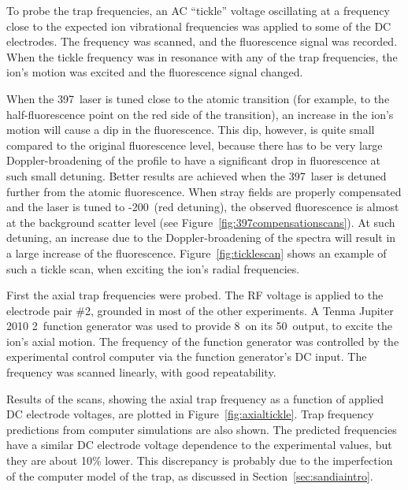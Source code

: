 To probe the trap frequencies, an AC ``tickle'' voltage oscillating at a frequency close to the expected ion vibrational frequencies was applied to some of the DC electrodes. The frequency was scanned, and the fluorescence signal was recorded. When the tickle frequency was in resonance with any of the trap frequencies, the ion's motion was excited and the fluorescence signal changed. 

When the 397\nm\, laser is tuned close to the atomic transition (for example, to the half-fluorescence point on the red side of the transition), an increase in the ion's motion will cause a dip in the fluorescence. This dip, however, is quite small compared to the original fluorescence level, because there has to be very large Doppler-broadening of the profile to have a significant drop in fluorescence at such small detuning. Better results are achieved when the 397\nm\, laser is detuned further from the atomic fluorescence. When stray fields are properly compensated and the laser is tuned to -200\MHz\, (red detuning), the observed fluorescence is almost at the background scatter level (see Figure~\ref{fig:397compensationscans}). At such detuning, an increase due to the Doppler-broadening of the spectra will result in a large increase of the fluorescence. Figure~\ref{fig:ticklescan} shows an example of such a tickle scan, when exciting the ion's radial frequencies.

First the axial trap frequencies were probed. The RF voltage is applied to the electrode pair \#2, grounded in most of the other experiments. A Tenma Jupiter 2010 2\MHz\, function generator was used to provide 8\Vpp\, on its 50\Ohm\, output, to excite the ion's axial motion. The frequency of the function generator was controlled by the experimental control computer via the function generator's DC input. The frequency was scanned linearly, with good repeatability.

Results of the scans, showing the axial trap frequency as a function of applied DC electrode voltages, are plotted in Figure~\ref{fig:axialtickle}. Trap frequency predictions from computer simulations are also shown. The predicted frequencies have a similar DC electrode voltage dependence to the experimental values, but they are about 10\% lower. This discrepancy is probably due to the imperfection of the computer model of the trap, as discussed in Section~\ref{sec:sandiaintro}.



